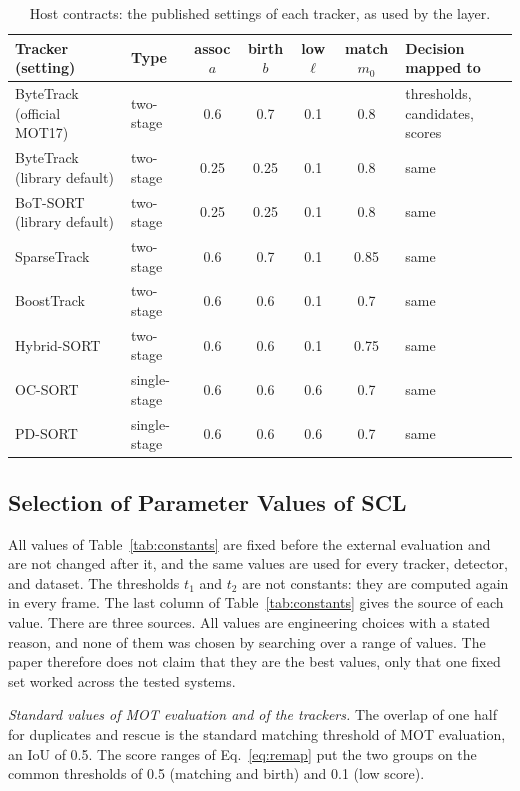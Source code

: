 \documentclass[pdflatex,sn-mathphys-num,iicol]{sn-jnl}
\begin{document}
\begin{table}[t]
\caption{Host contracts: the published settings of each tracker, as used by
the layer.}
\label{tab:contracts}
\centering\footnotesize
\setlength{\tabcolsep}{4pt}
\begin{tabular}{@{}>{\raggedright\arraybackslash}p{30mm}lcccc>{\raggedright\arraybackslash}p{32mm}@{}}
\toprule
Tracker (setting) & Type & assoc $a$ & birth $b$ & low $\ell$ & match $m_0$ & Decision mapped to\\
\midrule
ByteTrack (official MOT17) & two-stage & 0.6 & 0.7 & 0.1 & 0.8 & thresholds, candidates, scores\\
ByteTrack (library default) & two-stage & 0.25 & 0.25 & 0.1 & 0.8 & same\\
BoT-SORT (library default) & two-stage & 0.25 & 0.25 & 0.1 & 0.8 & same\\
SparseTrack & two-stage & 0.6 & 0.7 & 0.1 & 0.85 & same\\
BoostTrack & two-stage & 0.6 & 0.6 & 0.1 & 0.7 & same\\
Hybrid-SORT & two-stage & 0.6 & 0.6 & 0.1 & 0.75 & same\\
OC-SORT & single-stage & 0.6 & 0.6 & 0.6 & 0.7 & same\\
PD-SORT & single-stage & 0.6 & 0.6 & 0.6 & 0.7 & same\\
\bottomrule
\end{tabular}
\end{table}

\subsection{Selection of Parameter Values of SCL}\label{sec:constants}
All values of Table~\ref{tab:constants} are fixed before the external evaluation and are not
changed after it, and the same values are used for every tracker, detector, and dataset. The
thresholds $t_1$ and $t_2$ are not constants: they are computed again in every frame. The last
column of Table~\ref{tab:constants} gives the source of each value. There are three sources. All
values are engineering choices with a stated reason, and none of them was chosen by searching over
a range of values. The paper therefore does not claim that they are the best values, only that one fixed set
worked across the tested systems.

\emph{Standard values of MOT evaluation and of the trackers.} The overlap of one half for
duplicates and rescue is the standard matching threshold of MOT evaluation, an IoU of 0.5. The score
ranges of Eq.~\eqref{eq:remap} put the two groups on the common thresholds of 0.5 (matching and
birth) and 0.1 (low score).
\end{document}
